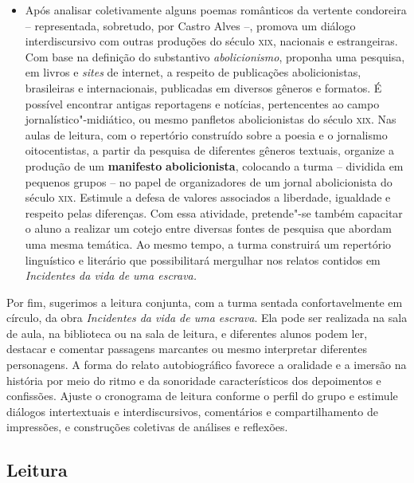 \documentclass[12pt]{extarticle}
\begin{document}
\begin{itemize}
\item
  Após analisar coletivamente alguns poemas românticos da vertente
  condoreira -- representada, sobretudo, por Castro Alves --, promova um
  diálogo interdiscursivo com outras produções do século \textsc{xix}, nacionais
  e estrangeiras. Com base na definição do substantivo
  \emph{abolicionismo}, proponha uma pesquisa, em livros e \emph{sites}
  de internet, a respeito de publicações abolicionistas, brasileiras e
  internacionais, publicadas em diversos gêneros e formatos. É possível
  encontrar antigas reportagens e notícias, pertencentes ao campo
  jornalístico"-midiático, ou mesmo panfletos abolicionistas do século
  \textsc{xix}. Nas aulas de leitura, com o repertório construído sobre a poesia
  e o jornalismo oitocentistas, a partir da pesquisa de diferentes
  gêneros textuais, organize a produção de um \textbf{manifesto}
  \textbf{abolicionista}, colocando a turma -- dividida em pequenos
  grupos -- no papel de organizadores de um jornal abolicionista do
  século \textsc{xix}. Estimule a defesa de valores associados a liberdade,
  igualdade e respeito pelas diferenças. Com essa atividade, pretende"-se
  também capacitar o aluno a realizar um cotejo entre diversas fontes de
  pesquisa que abordam uma mesma temática. Ao mesmo tempo, a turma
  construirá um repertório linguístico e literário que possibilitará
  mergulhar nos relatos contidos em \emph{Incidentes da vida de uma
  escrava.}
\end{itemize}

Por fim, sugerimos a leitura conjunta, com a turma sentada
confortavelmente em círculo, da obra \emph{Incidentes da vida de uma
escrava}. Ela pode ser realizada na sala de aula, na biblioteca ou na
sala de leitura, e diferentes alunos podem ler, destacar e comentar
passagens marcantes ou mesmo interpretar diferentes personagens. A forma
do relato autobiográfico favorece a oralidade e a imersão na história
por meio do ritmo e da sonoridade característicos dos depoimentos e
confissões. Ajuste o cronograma de leitura conforme o perfil do grupo e
estimule diálogos intertextuais e interdiscursivos, comentários e
compartilhamento de impressões, e construções coletivas de análises e
reflexões.

\subsection{Leitura}
\end{document}
